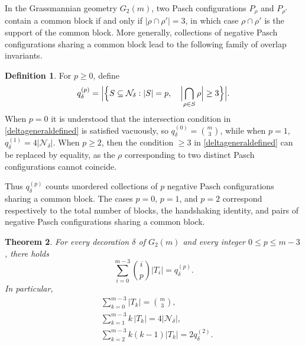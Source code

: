 \documentclass[times,11pt,reqno]{amsproc}
\newtheorem{theorem}{Theorem}[section]
\theoremstyle{definition}
\newtheorem{definition}[theorem]{Definition}
\numberwithin{equation}{section}
\begin{document}
In the Grassmannian geometry $G_2(m)$, two Pasch configurations
$P_\rho$ and $P_{\rho'}$ contain a common block if and only if $|\rho\cap\rho'|=3$, in which case $\rho\cap\rho'$ is the support of the common block.
More generally, collections of negative Pasch configurations sharing a
common block lead to the following family of overlap invariants.

\begin{definition}\label{deltageneral}
For $p\ge 0$, define
\begin{align}\label{deltageneraldefined}
q_\delta^{(p)}
=
\Bigl|
\Bigl\{
S\subseteq\mathcal N_\delta:
|S|=p,
\quad
\Bigl|\bigcap_{\rho\in S}\rho\Bigr|\geq 3
\Bigr\}
\Bigr|.
\end{align}
When $p = 0$ it is understood that the intersection condition in \eqref{deltageneraldefined} is satisfied vacuously, so $q_\delta^{(0)}
=
\binom{m}{3}$, while when $p = 1$, $q_\delta^{(1)}=4|\mathcal N_\delta|$. When $p \geq 2$, then the condition $\geq 3$ in \eqref{deltageneraldefined} can be replaced by equality, as the $\rho$ corresponding to two distinct Pasch configurations cannot coincide.
\end{definition}

Thus $q_\delta^{(p)}$ counts unordered collections of $p$ negative
Pasch configurations sharing a common block. The cases $p= 0$, $p= 1$, and $p =2$ correspond respectively to the total number of blocks, the handshaking
identity, and pairs of negative Pasch configurations sharing a common
block.

\begin{theorem}\label{thm:highermoments}
For every decoration $\delta$ of $G_2(m)$ and every integer $0\le p\le m-3$, there holds
\begin{equation}\label{momentgeneral}
\sum_{i=0}^{m-3}\binom{i}{p}|T_i|
=
q_\delta^{(p)}.
\end{equation}
In particular,
\begin{align}
&\sum_{k=0}^{m-3}|T_k|=
\binom{m}{3},\label{Ncount}\\
&\sum_{k=1}^{m-3}k\,|T_k|=
4|\mathcal N_\delta|,
\label{Handshake}\\
&\sum_{k=2}^{m-3}k(k-1)|T_k|=
2q_\delta^{(2)}.
\end{align}
\end{theorem}
\end{document}
